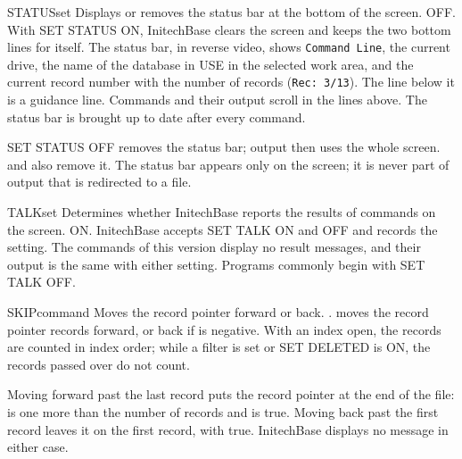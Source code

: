 \begin{XbaseEntry}{STATUS}{set}
Displays or removes the status bar at the bottom of the screen.
\Syntax
{}
\Defaults
OFF.
\Usage
With SET STATUS ON, InitechBase clears the screen and keeps the two bottom
lines for itself.  The status bar, in reverse video, shows \texttt{Command
Line}, the current drive, the name of the database in USE in the selected
work area, and the current record number with the number of records
(\texttt{Rec: 3/13}).  The line below it is a guidance line.  Commands and their
output scroll in the lines above.  The status bar is brought up to date after
every command.

SET STATUS OFF removes the status bar; output then uses the whole screen.
 and  also remove it.  The status bar appears only on the
screen; it is never part of output that is redirected to a file.
\end{XbaseEntry}

\begin{XbaseEntry}{TALK}{set}
Determines whether InitechBase reports the results of commands on the screen.
\Syntax
{}
\Defaults
ON.
\Usage
InitechBase accepts SET TALK ON and OFF and records the setting.  The commands
of this version display no result messages, and their output is the same with
either setting.  Programs commonly begin with SET TALK OFF.
\end{XbaseEntry}

\begin{XbaseEntry}{SKIP}{command}
Moves the record pointer forward or back.
\Syntax
{}
.
\Usage
{} moves the record pointer  records forward, or back if
 is negative.  With an index open, the records are counted in index
order; while a filter is set or SET DELETED is ON, the records passed over do
not count.

Moving forward past the last record puts the record pointer at the end of the
file:  is one more than the number of records and  is
true.  Moving back past the first record leaves it on the first record, with
 true.  InitechBase displays no message in either case.
\Examples
{}
\end{XbaseEntry}

